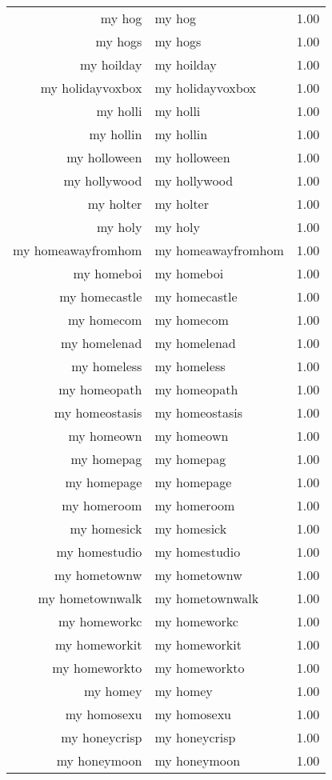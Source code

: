 \begin{table}[ht]
\begin{tabular}{rlr}
  my hog & my hog & 1.00 \\ 
  my hogs & my hogs & 1.00 \\ 
  my hoilday & my hoilday & 1.00 \\ 
  my holidayvoxbox & my holidayvoxbox & 1.00 \\ 
  my holli & my holli & 1.00 \\ 
  my hollin & my hollin & 1.00 \\ 
  my holloween & my holloween & 1.00 \\ 
  my hollywood & my hollywood & 1.00 \\ 
  my holter & my holter & 1.00 \\ 
  my holy & my holy & 1.00 \\ 
  my homeawayfromhom & my homeawayfromhom & 1.00 \\ 
  my homeboi & my homeboi & 1.00 \\ 
  my homecastle & my homecastle & 1.00 \\ 
  my homecom & my homecom & 1.00 \\ 
  my homelenad & my homelenad & 1.00 \\ 
  my homeless & my homeless & 1.00 \\ 
  my homeopath & my homeopath & 1.00 \\ 
  my homeostasis & my homeostasis & 1.00 \\ 
  my homeown & my homeown & 1.00 \\ 
  my homepag & my homepag & 1.00 \\ 
  my homepage & my homepage & 1.00 \\ 
  my homeroom & my homeroom & 1.00 \\ 
  my homesick & my homesick & 1.00 \\ 
  my homestudio & my homestudio & 1.00 \\ 
  my hometownw & my hometownw & 1.00 \\ 
  my hometownwalk & my hometownwalk & 1.00 \\ 
  my homeworkc & my homeworkc & 1.00 \\ 
  my homeworkit & my homeworkit & 1.00 \\ 
  my homeworkto & my homeworkto & 1.00 \\ 
  my homey & my homey & 1.00 \\ 
  my homosexu & my homosexu & 1.00 \\ 
  my honeycrisp & my honeycrisp & 1.00 \\ 
  my honeymoon & my honeymoon & 1.00 \\ 

\end{tabular}
\end{table}

